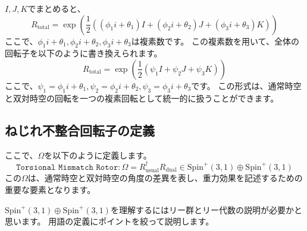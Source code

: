 \documentclass[a4paper,12pt,notitlepage]{jsreport}
\begin{document}
$ I, J, K $でまとめると、
\begin{equation}
  R_\text{total} = \exp\left( \frac{1}{2}\left( (\phi_1 i + \theta_1) I + (\phi_2 i + \theta_2) J + (\phi_3 i + \theta_3) K \right) \right)
\end{equation}
ここで、$ \phi_1 i + \theta_1, \phi_2 i + \theta_2, \phi_3 i + \theta_3 $は複素数です。
この複素数を用いて、全体の回転子を以下のように書き換えられます。
\begin{equation}
  R_\text{total} = \exp\left( \frac{1}{2}\left( \psi_1 I + \psi_2 J + \psi_3 K \right) \right)
\end{equation}
ここで、$ \psi_1 = \phi_1 i + \theta_1, \psi_2 = \phi_2 i + \theta_2, \psi_3 = \phi_3 i + \theta_3 $です。
この形式は、通常時空と双対時空の回転を一つの複素回転として統一的に扱うことができます。

\subsection{ねじれ不整合回転子の定義}

ここで、$ \Omega $を以下のように定義します。
\begin{equation}
  \texttt{Torsional Mismatch Rotor}: \Omega = R_\text{usual}^\dagger R_\text{dual} \in \mathrm{Spin}^+(3,1) \oplus \mathrm{Spin}^+(3,1)
\end{equation}
この$ \Omega $は、通常時空と双対時空の角度の差異を表し、重力効果を記述するための重要な要素となります。

$ \mathrm{Spin}^+(3,1) \oplus \mathrm{Spin}^+(3,1) $を理解するにはリー群とリー代数の説明が必要かと思います。
用語の定義にポイントを絞って説明します。
\end{document}
